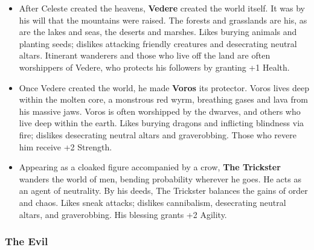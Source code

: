 \begin{itemize}
\item After Celeste created the heavens, {\bf Vedere} created the world 
itself.  It was by his will that the mountains were raised.  The forests 
and grasslands are his, as are the lakes and seas, the deserts and 
marshes.  Likes burying animals and planting seeds; dislikes attacking friendly
creatures and desecrating neutral altars.  Itinerant wanderers and those who 
live off the land are often worshippers of Vedere, who protects his followers 
by granting +1 Health.

\item Once Vedere created the world, he made {\bf Voros} its protector.  
Voros lives deep within the molten core, a monstrous red wyrm, breathing 
gases and lava from his massive jaws.  Voros is often worshipped by the 
dwarves, and others who live deep within the earth.  Likes burying dragons and
inflicting blindness via fire; dislikes desecrating neutral altars and
graverobbing.  Those who revere him receive +2 Strength.

\item Appearing as a cloaked figure accompanied by a crow, 
{\bf The Trickster} wanders the world of men, bending probability wherever 
he goes.  He acts as an agent of neutrality.  By his deeds, The Trickster 
balances the gains of order and chaos.  Likes sneak attacks; dislikes
cannibalism, desecrating neutral altars, and graverobbing.  His blessing 
grants +2 Agility.
\end{itemize}

\subsubsection{The Evil}

